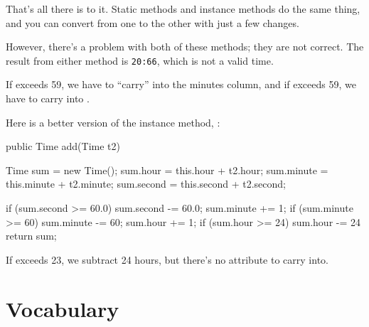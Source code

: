
That's all there is to it.
Static methods and instance methods do the same thing, and you can convert from one to the other with just a few changes.


However, there's a problem with both of these methods; they are not correct.
The result from either method is {\tt 20:66}, which is not a valid time.

If  exceeds 59, we have to ``carry'' into the minutes column, and if  exceeds 59, we have to carry into .

Here is a better version of the instance method, :

\begin{code}
public Time add(Time t2) {
    Time sum = new Time();
    sum.hour = this.hour + t2.hour;
    sum.minute = this.minute + t2.minute;
    sum.second = this.second + t2.second;
    
    if (sum.second >= 60.0) {
        sum.second -= 60.0;
        sum.minute += 1;
    }
    if (sum.minute >= 60) {
        sum.minute -= 60;
        sum.hour += 1;
    }
    if (sum.hour >= 24) {
        sum.hour -= 24
    }
    return sum;
}
\end{code}

If  exceeds 23, we subtract 24 hours, but there's no
 attribute to carry into.


\section{Vocabulary}

